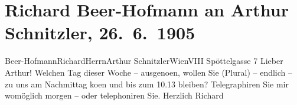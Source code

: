 

         \renewcommand{\erwaehnteOrte}{Orte: Edmund-Weiß-Gasse, I., Innere Stadt, Wien, XVIII., Währing}
         \renewcommand{\erwaehnteWerke}{}
               \section[Richard Beer-Hofmann an Arthur Schnitzler, 26. 6. 1905]{ Richard Beer-Hofmann an Arthur Schnitzler, 26. 6. 1905}\nopagebreak{}\rehead{ }\begin{ledgroupsized}[t]{13cm}\normalsize\beginnumbering \toendnotes[C]{\smallbreak\pagebreak[2]} 
\toendnotes[C]{\smallbreak}\pstart{}{\pb}Beer-Hofmann\pend{}\pstart{}Richard\pend{}{\bigskip}\pstart{}Herrn\pend{}\pstart{}Arthur Schnitzler\pend{}\pstart{}Wien\pend{}\pstart{}VIII Spöttelgasse 7\pend{}{\bigskip}\pstart
           \noindent{}{\pb}Lieber Arthur! Welchen Tag dieser Woche – \label{K_L01527_1v}\label{K_L01527_1h}
                  ausgeno{\geminationm}en, wollen Sie (Plural) – endlich –  zu uns am Nachmittag ko{\geminationm}en und bis zum 10.13 bleiben?
               Telegraphiren Sie mir womöglich morgen – oder telephoniren Sie.
               Herzlich\pend
           \pstart
           \spacefill\mbox{Richard}\pend
           
         
         \endnumbering{}\end{ledgroupsized}  \newcommand{\dateiname}{L01527}\newcommand{\titel}{Richard Beer-Hofmann an Arthur Schnitzler, 26. 6. 1905}\newcommand{\editorInnen}{Martin Anton Müller und Gerd-Hermann Susen}
      